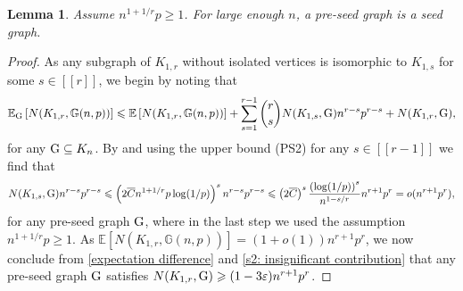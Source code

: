 \documentclass[a4paper,11pt,english,reqno]{amsart}
\numberwithin{equation}{section}
\renewcommand{\leq}{\leqslant}
\renewcommand{\geq}{\geqslant}
\newcommand{\cbar}{\overline{C}}
\newcommand{\E}{\mathbb{E}}
\newcommand{\G}{\mathbb{G}}
\newcommand{\tu}[1]{\textup{#1}}
\newcommand{\set}[1]{[\![#1]\!]}
\newtheorem{lemma}[theorem]{Lemma}
\begin{document}
			
			
			
			
			
			
			
			
			\begin{lemma}
				\label{preseed to seed}
				Assume $n^{1+1/r}p \geq 1$. For large enough $n$, a pre-seed graph is a seed graph.
			\end{lemma}
			\begin{proof}
				As any subgraph of $K_{1,r}$ without isolated vertices is isomorphic to $K_{1,s}$ for some $s\in \set{r}$, we begin by noting that %
				\begin{equation}
					\label{expectation difference}
					\E_{\tu{G}}\left[N(K_{1,r}, \G(n,p))\right]  \leq\E\left[N(K_{1,r}, \G(n,p))\right]+ \sum_{s=1}^{r-1}{{r\choose s}} N(K_{1,s}, \tu{G}) n^{r-s}p^{r-s} + N(K_{1,r}, \tu{G}),
				\end{equation}
				for any $\tu{G}\subseteq K_n$.  
				By \cite[Theorem~5.4]{HMS} and using the upper bound (PS2) for any $s \in \set{r-1}$ we find that 
				\begin{equation}
					\label{s2: insignificant contribution}
					\begin{aligned}
						N(K_{1,s}, \tu{G}) n^{r-s}p^{r-s} \leq \left( 2\cbar n^{1+1/r}p \log(1/p)\right)^{s} n^{r-s}p^{r-s}\leq \left(2\cbar \right)^{s} \frac{\left(\log(1/p)\right)^{s}}{n^{1-s/r}} n^{r+1}p^{r} = o(n^{r+1}p^{r}), 
					\end{aligned}
				\end{equation}
				for any pre-seed graph $\tu{G}$, where in the last step we used the assumption $n^{1+1/r}p \geq 1$.
				As $\E[N(K_{1,r}, \G(n,p))] = (1+o(1))n^{r+1}p^{r}$, we now conclude from \eqref{expectation difference} and \eqref{s2: insignificant contribution} that any pre-seed graph $\tu{G}$ satisfies $N(K_{1,r},\tu{G}) \geq (1-3\varepsilon) n^{r+1}p^{r}$.
			\end{proof}
\end{document}
